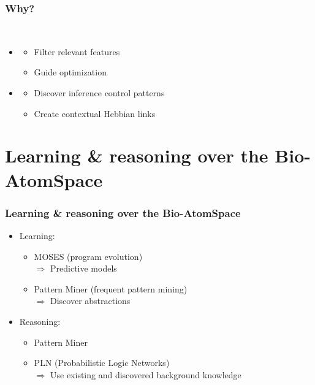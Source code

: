 \documentclass[aspectratio=169]{beamer}
\begin{document}
\begin{frame}
  \frametitle{Why?}


  \\[1cm]
  
  \begin{itemize}
  \item \color{red}{Reasoning for meta-learning}
    \begin{itemize}
    \item Filter relevant features
    \item Guide optimization
    \end{itemize}
  \item \color{red}{Learning for meta-reasoning}
    \begin{itemize}
    \item Discover inference control patterns
    \item Create contextual Hebbian links
    \end{itemize}
  \end{itemize}

\end{frame}

\section{Learning \& reasoning over the Bio-AtomSpace}

\begin{frame}
  \frametitle{Learning \& reasoning over the Bio-AtomSpace}

  \begin{itemize}
  \item Learning:\\
    \begin{itemize}
    \item MOSES (program evolution)\\
      $\Rightarrow$ \alert{Predictive models}
    \item Pattern Miner (frequent pattern mining)\\
      $\Rightarrow$ \alert{Discover abstractions}
    \end{itemize}
  \item Reasoning:\\
    \begin{itemize}
    \item Pattern Miner
    \item PLN (Probabilistic Logic Networks)\\
      $\Rightarrow$ \alert{Use existing and discovered background knowledge}
    \end{itemize}
  \end{itemize}
  
\end{frame}
\end{document}
